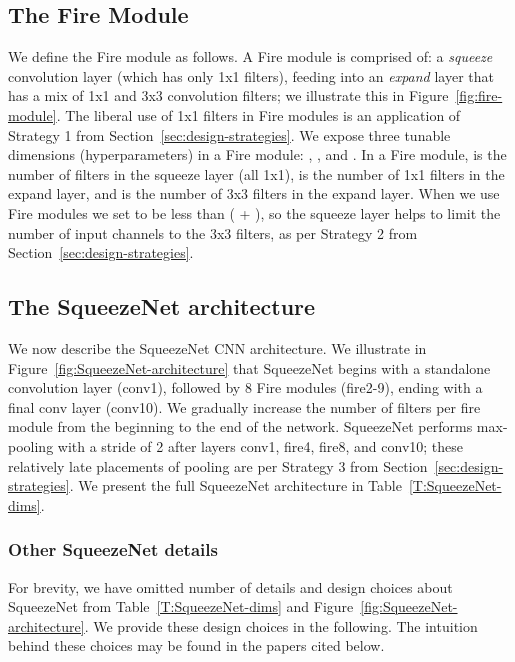 \documentclass{article} \usepackage{iclr2017_conference,times}
\def\vsp{\vspace{-0.15in}}
\begin{document}
\subsection{The Fire Module}
\label{sec:fire-module}
\vsp

We define the Fire module as follows.
A Fire module is comprised of: a {\em squeeze} convolution layer (which has only 1x1 filters), feeding into an {\em expand} layer that has a mix of 1x1 and 3x3 convolution filters; we illustrate this in Figure~\ref{fig:fire-module}.
The liberal use of 1x1 filters in Fire modules is an application of Strategy 1 from Section~\ref{sec:design-strategies}.
We expose three tunable dimensions (hyperparameters) in a Fire module: , , and .
In a Fire module,  is the number of filters in the squeeze layer (all 1x1),  is the number of 1x1 filters in the expand layer, and  is the number of 3x3 filters in the expand layer.
When we use Fire modules we set  to be less than ( + ), so the squeeze layer helps to limit the number of input channels to the 3x3 filters, as  per Strategy 2 from Section~\ref{sec:design-strategies}.

\subsection{The SqueezeNet architecture}
\label{sec:squeezenet-arch}
\vsp

We now describe the SqueezeNet CNN architecture. We illustrate in Figure~\ref{fig:SqueezeNet-architecture} that SqueezeNet begins with a standalone convolution layer (conv1), followed by 8 Fire modules (fire2-9), ending with a final conv layer (conv10).
We gradually increase the number of filters per fire module from the beginning to the end of the network.
SqueezeNet performs max-pooling with a stride of 2 after layers conv1, fire4, fire8, and conv10; these relatively late placements of pooling are per Strategy 3 from Section~\ref{sec:design-strategies}.
We present the full SqueezeNet architecture in Table~\ref{T:SqueezeNet-dims}.

\subsubsection{Other SqueezeNet details}
\label{sec:squeezenet-details}
\vspace{-0.1in}

For brevity, we have omitted number of details and design choices about SqueezeNet from Table~\ref{T:SqueezeNet-dims} and Figure~\ref{fig:SqueezeNet-architecture}.
We provide these design choices in the following.
The intuition behind these choices may be found in the papers cited below.
\end{document}
